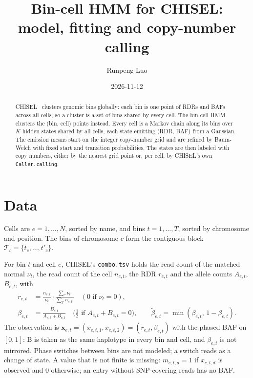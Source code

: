 \documentclass[11pt]{article}
\title{Bin-cell HMM for CHISEL:\\model, fitting and copy-number calling}
\author{Runpeng Luo}
\date{2026-11-12}
\newcommand{\code}[1]{\texttt{#1}}
\newcommand{\x}{\mathbf{x}}
\begin{document}
\maketitle

\begin{abstract}
CHISEL~\cite{zaccaria2021} clusters genomic bins globally: each bin is one point of RDRs and BAFs across all cells,
so a cluster is a set of bins shared by every cell. The bin-cell HMM clusters the
(bin, cell) points instead. Every cell is a Markov chain along its bins over $K$ hidden states
shared by all cells, each state emitting (RDR, BAF) from a Gaussian. The emission means start
on the integer copy-number grid and are refined by Baum-Welch with fixed start and transition
probabilities. The states are then labeled with copy numbers, either by the nearest grid point
or, per cell, by CHISEL's own \code{Caller.calling}.
\end{abstract}

\section{Data}\label{sec:data}

Cells are $e = 1, \dots, N$, sorted by name, and bins $t = 1, \dots, T$, sorted by chromosome
and position. The bins of chromosome $c$ form the contiguous block
$\mathcal{T}_c = \{t_c, \dots, t'_c\}$.

For bin $t$ and cell $e$, CHISEL's \code{combo.tsv} holds the read count of the matched normal
$\nu_t$, the read count of the cell $n_{e,t}$, the RDR $r_{e,t}$ and the allele counts
$A_{e,t}$, $B_{e,t}$, with
\begin{align}
r_{e,t} &= \frac{n_{e,t}}{\nu_t}\cdot\frac{\sum_{t'}\nu_{t'}}{\sum_{t'} n_{e,t'}}
  \quad (0 \text{ if } \nu_t = 0), \label{eq:rdr}\\
\beta_{e,t} &= \frac{B_{e,t}}{A_{e,t}+B_{e,t}}
  \quad \bigl(\tfrac12 \text{ if } A_{e,t}+B_{e,t} = 0\bigr), \qquad
\tilde\beta_{e,t} = \min(\beta_{e,t},\, 1-\beta_{e,t}). \label{eq:baf}
\end{align}
The observation is $\x_{e,t} = (x_{e,t,1}, x_{e,t,2}) = (r_{e,t}, \beta_{e,t})$ with the phased
BAF on $[0, 1]$: B is taken as the same haplotype in every bin and cell, and $\beta_{e,t}$ is not
mirrored. Phase switches between bins are not modeled; a switch reads as a change of state. A value
that is not finite is missing: $m_{e,t,d} = 1$ if $x_{e,t,d}$ is observed and $0$ otherwise; an
entry without SNP-covering reads has no BAF.
\end{document}
